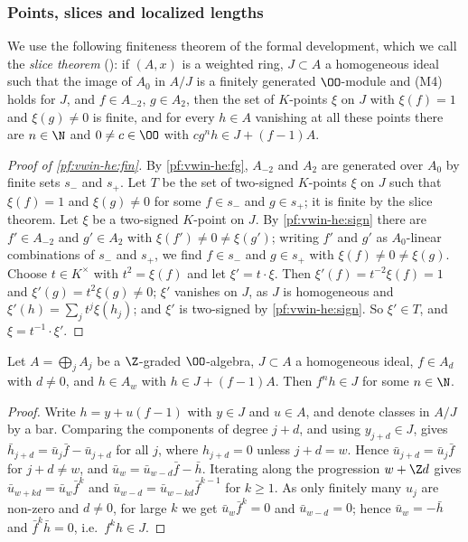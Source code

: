 \subsubsection{Points, slices and localized lengths}\label{sec:pf:vwin-he:pf-points}

We use the following finiteness theorem of the formal development, which we call the \emph{slice theorem}
(): if $(A,x)$ is a weighted ring, $J\subset A$ a homogeneous ideal such
that the image of $A_0$ in $A/J$ is a finitely generated $\OO$-module and \textup{(M4)} holds for $J$, and
$f\in A_{-2}$, $g\in A_2$, then the set of $K$-points $\xi$ on $J$ with $\xi(f)=1$ and $\xi(g)\ne0$ is finite, and for
every $h\in A$ vanishing at all these points there are $n\in\N$ and $0\ne c\in\OO$ with $cg^nh\in J+(f-1)A$.

\begin{proof}[Proof of \cref{pf:vwin-he:fin}]
By \cref{pf:vwin-he:fg}, $A_{-2}$ and $A_2$ are generated over $A_0$ by finite sets $s_-$ and $s_+$. Let $T$ be the
set of two-signed $K$-points $\xi$ on $J$ such that $\xi(f)=1$ and $\xi(g)\ne0$ for some $f\in s_-$ and $g\in s_+$; it
is finite by the slice theorem. Let $\xi$ be a two-signed $K$-point on $J$. By \cref{pf:vwin-he:sign} there are
$f'\in A_{-2}$ and $g'\in A_2$ with $\xi(f')\ne0\ne\xi(g')$; writing $f'$ and $g'$ as $A_0$-linear combinations of
$s_-$ and $s_+$, we find $f\in s_-$ and $g\in s_+$ with $\xi(f)\ne0\ne\xi(g)$. Choose $t\in K^\times$ with
$t^2=\xi(f)$ and let $\xi'=t\cdot\xi$. Then $\xi'(f)=t^{-2}\xi(f)=1$ and $\xi'(g)=t^2\xi(g)\ne0$; $\xi'$ vanishes on
$J$, as $J$ is homogeneous and $\xi'(h)=\sum_jt^j\xi(h_j)$; and $\xi'$ is two-signed by \cref{pf:vwin-he:sign}. So
$\xi'\in T$, and $\xi=t^{-1}\cdot\xi'$.
\end{proof}

\begin{lemma}\label{pf:vwin-he:deh}
Let $A=\bigoplus_jA_j$ be a $\Z$-graded $\OO$-algebra, $J\subset A$ a homogeneous ideal, $f\in A_d$ with $d\ne0$, and
$h\in A_w$ with $h\in J+(f-1)A$. Then $f^nh\in J$ for some $n\in\N$.
\end{lemma}

\begin{proof}
Write $h=y+u(f-1)$ with $y\in J$ and $u\in A$, and denote classes in $A/J$ by a bar. Comparing the components of
degree $j+d$, and using $y_{j+d}\in J$, gives $\bar h_{j+d}=\bar u_j\bar f-\bar u_{j+d}$ for all $j$, where
$h_{j+d}=0$ unless $j+d=w$. Hence $\bar u_{j+d}=\bar u_j\bar f$ for $j+d\ne w$, and
$\bar u_w=\bar u_{w-d}\bar f-\bar h$. Iterating along the progression $w+\Z d$ gives $\bar u_{w+kd}=\bar u_w\bar f^k$
and $\bar u_{w-d}=\bar u_{w-kd}\bar f^{k-1}$ for $k\ge1$. As only finitely many $u_j$ are non-zero and $d\ne0$, for
large $k$ we get $\bar u_w\bar f^k=0$ and $\bar u_{w-d}=0$; hence $\bar u_w=-\bar h$ and $\bar f^k\bar h=0$, i.e.\
$f^kh\in J$.
\end{proof}

